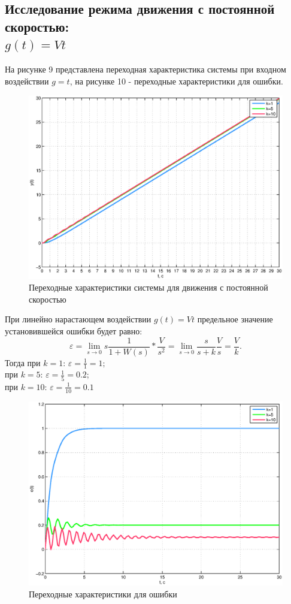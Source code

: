 \documentclass[12pt,a4paper]{article}
\begin{document}
\subsection{Исследование режима движения с постоянной скоростью: \\$g(t)=Vt$} 
На рисунке 9 представлена переходная характеристика системы при входном воздействии $g=t$, на рисунке 10  - переходные характеристики для ошибки.
\begin{figure}[H]
	\centering
	\includegraphics[width=0.8\linewidth]{scheme/plot7.eps}
	\caption{Переходные характеристики системы для движения с постоянной скоростью}
\end{figure}
При линейно нарастающем воздействии $g(t)=Vt$ предельное значение установившейся ошибки будет равно:
\begin{equation}
    \varepsilon = \lim_{s\to 0}s\frac{1}{1+W(s)}*\frac{V}{s^2} = \lim_{s\to 0}\frac{s}{s+k}\frac{V}{s} = \frac{V}{k}.
\end{equation}
Тогда при $k=1$: $\varepsilon = \displaystyle{\frac{1}{1} = 1;}$\\
при $k=5$: $\varepsilon = \displaystyle{\frac{1}{5} = 0.2;}$\\
при $k=10$: $\varepsilon = \displaystyle{\frac{1}{10} = 0.1}$
\begin{figure}[H]
	\centering
	\includegraphics[width=0.8\linewidth]{scheme/plot8.eps}
	\caption{Переходные характеристики для ошибки}
\end{figure}
\end{document}
